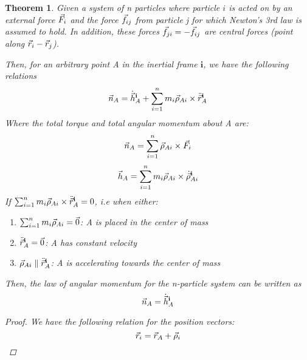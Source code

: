 \documentclass{article}
\newtheorem{theorem}{Theorem}
\begin{document}
\begin{theorem}
    Given a system of n particles where particle $i$ is acted on by an external force $\vec{F}_i$ and the force $\vec{f}_{ij}$ from particle j for which
    Newton's 3rd law is assumed to hold. In addition, these forces $\vec{f}_{ji} = -\vec{f}_{ij}$ are central forces (point along $\vec{r}_i-\vec{r}_j$).
    
    Then, for an arbitrary point A in the inertial frame $\mathbf{i}$, we have the following relations
    $$\vec{n}_A = \dot{\vec{h}}_A^{\mathbf{i}} + \sum_{i=1}^nm_i\vec{\rho}_{Ai}\times\ddot{\vec{r}}_A^{\mathbf{i}}$$
    Where the total torque and total angular momentum about A are:
    $$\vec{n}_A = \sum_{i=1}^n\vec{\rho}_{Ai}\times{\vec{F}}_i$$
    $$\vec{h}_A = \sum_{i=1}^nm_i\vec{\rho}_{Ai}\times\dot{\vec{\rho}}_{Ai}^{\mathbf{i}}$$
    If $\sum_{i=1}^nm_i\vec{\rho}_{Ai}\times\ddot{\vec{r}}_A^{\mathbf{i}} = 0$, i.e when either:
    \begin{enumerate}
        \item $\sum_{i=1}^nm_i\vec{\rho}_{Ai} = \vec{0}$: A is placed in the center of mass
        \item $\ddot{\vec{r}}_A^{\mathbf{i}} = \vec{0}$: A has constant velocity
        \item $\vec{\rho}_{Ai} \parallel \ddot{\vec{r}}_A^{\mathbf{i}}$: A is accelerating towards the center of mass
    \end{enumerate}
    Then, the law of angular momentum for the n-particle system can be written as
    $$\vec{n}_A = \dot{\vec{h}}_A^{\mathbf{i}}$$
    \begin{proof}
        We have the following relation for the position vectors:
        $$\vec{r}_i = \vec{r}_A+\vec{\rho}_i$$


\end{proof}
\end{theorem}
\end{document}

